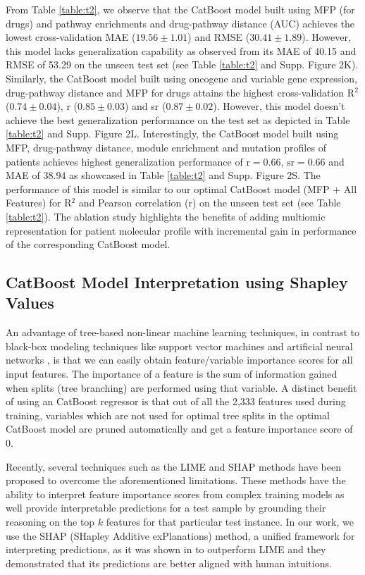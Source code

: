 \documentclass[pdflatex,sn-mathphys-num]{sn-jnl}%
\theoremstyle{thmstyleone}%
\theoremstyle{thmstyletwo}%
\theoremstyle{thmstylethree}%
\begin{document}
From Table \ref{table:t2}, we observe that the CatBoost model built using MFP (for drugs) and pathway enrichments and drug-pathway distance (AUC) achieves the lowest cross-validation MAE ($19.56 \pm 1.01$) and RMSE ($30.41 \pm 1.89$). However, this model lacks generalization capability as observed from its MAE of 40.15 and RMSE of 53.29 on the unseen test set (see Table \ref{table:t2} and Supp. Figure 2K). Similarly, the CatBoost model built using oncogene and variable gene expression, drug-pathway distance and MFP for drugs attains the highest cross-validation R$^2$ ($0.74 \pm 0.04$), r ($0.85 \pm 0.03$) and sr ($0.87 \pm 0.02$). However, this model doesn't achieve the best generalization performance on the test set as depicted in Table \ref{table:t2} and Supp. Figure 2L. Interestingly, the CatBoost model built using MFP, drug-pathway distance, module enrichment and mutation profiles of patients achieves highest generalization performance of $\text{r}=0.66$, $\text{sr}=0.66$ and MAE of $38.94$ as showcased in Table \ref{table:t2} and Supp. Figure 2S. The performance of this model is similar to our optimal CatBoost model (MFP + All Features) for R$^2$ and Pearson correlation (r) on the unseen test set (see Table \ref{table:t2}). The ablation study highlights the benefits of adding multiomic representation for patient molecular profile with incremental gain in performance of the corresponding CatBoost model. 
\subsection{CatBoost Model Interpretation using Shapley Values}
An advantage of tree-based non-linear machine learning techniques, in contrast to black-box modeling techniques like support vector machines \cite{mall2015very} and artificial neural networks \cite{fausett2006fundamentals}, is that we can easily obtain feature/variable importance scores for all input features. The importance of a feature is the sum of information gained when splits (tree branching) are performed using that variable. A distinct benefit of using an CatBoost regressor is that out of all the 2,333 features used during training, variables which are not used for optimal tree splits in the optimal CatBoost model are pruned automatically and get a feature importance score of 0. 

Recently, several techniques such as the LIME \cite{ribeiro2016should} and SHAP \cite{lundberg2017unified} methods have been proposed to overcome the aforementioned limitations. These methods have the ability to interpret feature importance scores from complex training models as well provide interpretable predictions for a test sample by grounding their reasoning on the top $k$ features for that particular test instance. In our work, we use the SHAP (SHapley Additive exPlanations) method, a unified framework for interpreting predictions, as it was shown in \cite{lundberg2017unified} to outperform LIME and they demonstrated that its predictions are better aligned with human intuitions.
\end{document}
